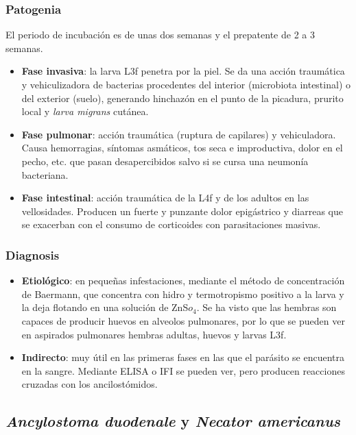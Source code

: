 \subsubsection{Patogenia}
El periodo de incubación es de unas dos semanas y el prepatente de 2 a 3 semanas.
\begin{itemize}[itemsep=0pt,parsep=0pt,topsep=0pt,partopsep=0pt]
	\item \textbf{Fase invasiva}: la larva L3f penetra por la piel. Se da una acción traumática y vehiculizadora de bacterias procedentes del interior (microbiota intestinal) o del exterior (suelo), generando hinchazón en el punto de la picadura, prurito local y \textit{larva migrans} cutánea.
	\item \textbf{Fase pulmonar}: acción traumática (ruptura de capilares) y vehiculadora. Causa hemorragias, síntomas asmáticos, tos seca e improductiva, dolor en el pecho, etc. que pasan desapercibidos salvo si se cursa una neumonía bacteriana.
	\item \textbf{Fase intestinal}: acción traumática de la L4f y de los adultos en las vellosidades. Producen un fuerte y punzante dolor epigástrico y diarreas que se exacerban con el consumo de corticoides con parasitaciones masivas.
\end{itemize}
\subsubsection{Diagnosis}
\begin{itemize}[itemsep=0pt,parsep=0pt,topsep=0pt,partopsep=0pt]
	\item \textbf{Etiológico}: en pequeñas infestaciones, mediante el método de concentración de Baermann, que concentra con hidro y termotropismo positivo a la larva y la deja flotando en una solución de ZnS$o_4$. Se ha visto que las hembras son capaces de producir huevos en alveolos pulmonares, por lo que se pueden ver en aspirados pulmonares hembras adultas, huevos y larvas L3f.
	\item \textbf{Indirecto}: muy útil en las primeras fases en las que el parásito se encuentra en la sangre. Mediante ELISA o IFI se pueden ver, pero producen reacciones cruzadas con los ancilostómidos.
\end{itemize}
\newpage
\subsection{\textit{Ancylostoma duodenale} y \textit{Necator americanus}}
